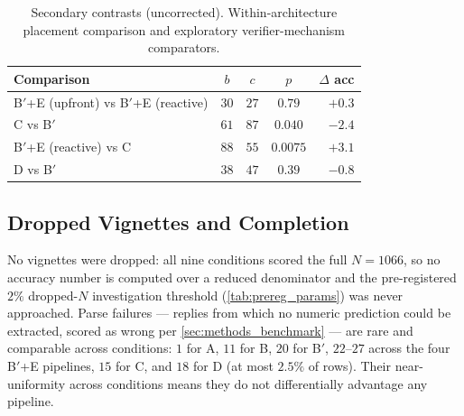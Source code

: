 \begin{table}[!htbp]
  \centering
  \caption{Secondary contrasts (uncorrected). Within-architecture
  placement comparison and exploratory verifier-mechanism
  comparators.}
  \label{tab:mcnemar_exploratory}
  \begin{tabular}{lcccr}
    \toprule
    Comparison & $b$ & $c$ & $p$ & $\Delta$ acc \\
    \midrule
    B$'$+E (upfront) vs B$'$+E (reactive)   & $30$ & $27$ & $0.79$   & $+0.3$ \\
    C vs B$'$                               & $61$ & $87$ & $0.040$  & $-2.4$ \\
    B$'$+E (reactive) vs C                  & $88$ & $55$ & $0.0075$ & $+3.1$ \\
    D vs B$'$                               & $38$ & $47$ & $0.39$   & $-0.8$ \\
    \bottomrule
  \end{tabular}
\end{table}

\subsection{Dropped Vignettes and Completion}
\label{sec:results_completion}

No vignettes were dropped: all nine conditions scored the full
$N = 1066$, so no accuracy number is computed over a reduced
denominator and the pre-registered $2\%$ dropped-$N$ investigation
threshold (\cref{tab:prereg_params}) was never approached. Parse
failures --- replies from which no numeric prediction could be
extracted, scored as wrong per \cref{sec:methods_benchmark} --- are
rare and comparable across conditions: $1$ for A, $11$ for B, $20$ for
B$'$, $22$--$27$ across the four B$'$+E pipelines, $15$ for C, and $18$
for D (at most $2.5\%$ of rows). Their near-uniformity across conditions
means they do not differentially advantage any pipeline.
